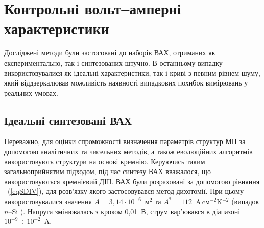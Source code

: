 \documentclass[a4paper,14pt,oneside,openany]{memoir}
\begin{document}
\section{Контрольні вольт--амперні характеристики}
Досліджені методи були застосовані до наборів ВАХ, отриманих як експериментально, так і синтезованих штучно.
В останньому випадку використовувалися як ідеальні характеристики, так і криві з певним рівнем шуму, який віддзеркалював можливість наявності випадкових похибок вимірювань у реальних умовах.

\subsection{Ідеальні синтезовані ВАХ}
Переважно, для оцінки спроможності визначення параметрів структур МН за допомогою аналітичних \cite{Norde,Lien,Werner,Gromov,Lee,Bohlin,Cibils,Mikhelashvili,Kaminski} та чисельних \cite{Evangelou,Donoval} методів, а також еволюційних алгоритмів \cite{PSO_Ye,P-DE_Ishaque,TLBO_Patel} використовують структури на основі кремнію.
Керуючись таким загальноприйнятим підходом, під час синтезу ВАХ вважалося, що використовуються кремнієвий ДШ.
ВАХ були розраховані за допомогою рівняння ~(\ref{eqSDIV}), для розв'язку якого застосовувався метод дихотомії.
При цьому використовувалися значення $A=3,14\cdot10^{-6}$~м$^2$ та $A^*=112$~A$\,$cм$^{-2}$K$^{-2}$ (випадок $n$--Si \cite{Schroder2006}).
Напруга змінювалась з кроком 0,01~В, струм вар'ювався в діапазоні $10^{-9}\div10^{-2}$~A.
\end{document}

